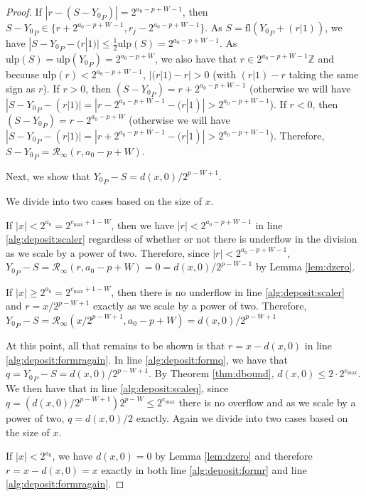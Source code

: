 \documentclass[12pt]{article}
\providecommand{\Z}{\ensuremath{\mathbb{Z}}}
\providecommand{\max}{\ensuremath{\text{max}}}
\providecommand{\ulp}{\ensuremath{\text{ulp}}}
\providecommand{\fl}{\ensuremath{\text{fl}}}
\providecommand{\roundtonearestinfty}{\ensuremath{\mathcal{R}_\text{$\infty$}}}
\theoremstyle{definition}
\numberwithin{equation}{section}
\numberwithin{figure}{section}
\begin{document}
\begin{proof}
        If $|r - (S - {Y_0}_P)| = 2^{a_{0} - p + W - 1}$, then $S - {Y_0}_P \in \{r + 2^{a_0 - p + W - 1},  r_j - 2^{a_{0} - p + W - 1}\}$.
        As $S = \fl({Y_0}_P + (r|1))$, we have $|S - {Y_0}_P - (r|1)| \leq \frac{1}{2}\ulp(S) = 2^{a_{0} - p + W - 1}$.  As $\ulp(S) = \ulp({Y_0}_P) = 2^{a_{0} - p + W}$, we also have that $r \in 2^{a_{0} - p + W - 1}\Z$  and because $\ulp(r) < 2^{a_{0} - p + W - 1}$, $|(r|1) - r| > 0$ (with $(r|1) - r$ taking the same sign as $r$).
        If $r > 0$, then $(S - {Y_0}_P) = r + 2^{a_{0} - p + W - 1}$ (otherwise we will have $|S - {Y_0}_P - (r|1)| = |r - 2^{a_{0} - p + W - 1} - (r|1)| > 2^{a_{0} - p + W - 1}$).
        If $r < 0$, then $(S - {Y_0}_P) = r - 2^{a_{0} - p + W}$ (otherwise we will have $|S - {Y_0}_P - (r|1)| = |r + 2^{a_{0} - p + W - 1} - (r|1)| > 2^{a_{0} - p + W - 1}$). Therefore, $S - {Y_0}_P = \roundtonearestinfty(r, a_{0} - p + W)$.

        Next, we show that ${Y_0}_P - S = d(x, 0)/2^{p - W + 1}$.

        We divide into two cases based on the size of $x$.

        If $|x| < 2^{a_0} = 2^{e_{\max} + 1 - W}$, then we have $|r| < 2^{a_0 - p + W - 1}$ in line \ref{alg:deposit:scaler} regardless of whether or not there is underflow in the division as we scale by a power of two.
         Therefore, since $|r| < 2^{a_0 - p + W - 1}$, ${Y_0}_P - S = \roundtonearestinfty(r, a_0 - p + W) = 0 = d(x, 0)/2^{p - W - 1}$ by Lemma \ref{lem:dzero}.

        If $|x| \geq 2^{a_0}= 2^{e_{\max} + 1 - W}$, then there is no underflow in line \ref{alg:deposit:scaler} and $r = x / 2^{p - W + 1}$ exactly as we scale by a power of two. Therefore, ${Y_0}_P - S = \roundtonearestinfty(x/2^{p - W + 1}, a_0 - p + W) = d(x, 0)/2^{p - W + 1}$

        At this point, all that remains to be shown is that $r = x - d(x, 0)$ in line \ref{alg:deposit:formragain}. In line \ref{alg:deposit:formq}, we have that $q = {Y_0}_P - S = d(x, 0)/2^{p - W + 1}$. By Theorem \ref{thm:dbound}, $d(x, 0) \leq 2 \cdot 2^{e_{\max}}$. We then have that in line \ref{alg:deposit:scaleq}, since $q = (d(x, 0)/2^{p - W + 1})2^{p - W} \leq 2^{e_{\max}}$ there is no overflow and as we scale by a power of two, $q = d(x, 0)/2$ exactly. Again we divide into two cases based on the size of $x$.

        If $|x| < 2^{a_0}$, we have $d(x, 0) = 0$ by Lemma \ref{lem:dzero} and therefore $r = x - d(x, 0) = x$ exactly in both line \ref{alg:deposit:formr} and line \ref{alg:deposit:formragain}.


\end{proof}
\end{document}
